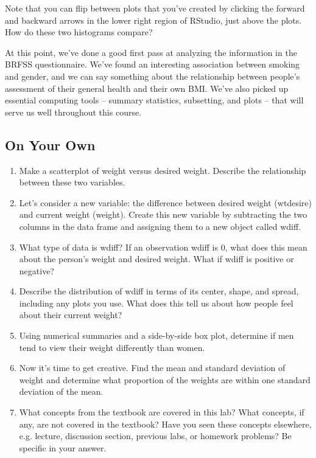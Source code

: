 \documentclass{article}\usepackage[]{graphicx}\usepackage[]{color}
\newcommand{\hlstd}[1]{\textcolor[rgb]{0.345,0.345,0.345}{#1}}%
\begin{document}
Note that you can flip between plots that you've created by clicking the forward and backward arrows in the lower right region of RStudio, just above the plots.  How do these two histograms compare?

At this point, we've done a good first pass at analyzing the information in the BRFSS questionnaire.  We've found an interesting association between smoking and gender, and we can say something about the relationship between people's assessment of their general health and their own BMI.  We've also picked up essential computing tools -- summary statistics, subsetting, and plots -- that will serve us well throughout this course.

\vfill

\subsection*{On Your Own}

\begin{enumerate}
\item Make a scatterplot of weight versus desired weight. Describe the relationship between these two variables.
\item Let's consider a new variable: the difference between desired weight (\hlstd{wtdesire}) and current weight (\hlstd{weight}). Create this new variable by subtracting the two columns in the data frame and assigning them to a new object called \hlstd{wdiff}.
\item What type of data is \hlstd{wdiff}? If an observation \hlstd{wdiff} is 0, what does this mean about the person's weight and desired weight. What if \hlstd{wdiff} is positive or negative?
\item Describe the distribution of \hlstd{wdiff} in terms of its center, shape, and spread, including any plots you use. What does this tell us about how people feel about their current weight?
\item Using numerical summaries and a side-by-side box plot, determine if men tend to view their weight differently than women.
\item Now it's time to get creative. Find the mean and standard deviation of \hlstd{weight} and determine what proportion of the weights are within one standard deviation of the mean.
\item What concepts from the textbook are covered in this lab?  What concepts, if any, are not covered in the textbook?  Have you seen these concepts elsewhere, e.g. lecture, discussion section, previous labs, or homework problems?  Be specific in your answer.
\end{enumerate}
\end{document}
